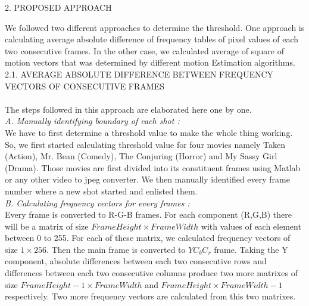 \documentclass[twocolumn,twoside]{article}
\begin{document}
		
		\vspace{-0.6cm}
		\begin{center}
		    {\large 2. PROPOSED APPROACH}
		\end{center} 
		\vspace{-0.5cm}
		
We followed two different approaches to determine the threshold. One approach is calculating average absolute difference of frequency tables of pixel values of each two consecutive frames. In the other case, we calculated average of square of motion vectors that was determined by different motion Estimation algorithms. \\   
		
		\vspace{3cm}
		{\normalsize 2.1. AVERAGE ABSOLUTE DIFFERENCE BETWEEN FREQUENCY VECTORS OF CONSECUTIVE FRAMES}\\ \\
		
The steps followed in this approach are elaborated here one by one.\\
		
		\textit{A. Manually identifying boundary of each shot :}\\
		
		We have to first determine a threshold value to make the whole thing working. So, we first started calculating threshold value for four movies namely Taken (Action), Mr. Bean (Comedy), The Conjuring (Horror) and My Sassy Girl (Drama). Those movies are first divided into its constituent frames using Matlab or any other video to jpeg converter. We then manually identified every frame number where a new shot started and enlisted them.\\ 
		
		\vspace{0.4cm}
		\textit{B. Calculating frequency vectors for every frames : }\\ 
		
		Every frame is converted to R-G-B frames. For each component (R,G,B) there will be a matrix of size $FrameHeight\times FrameWidth$ with values of each element between 0 to 255. For each of these matrix, we calculated frequency vectors of size $1\times 256$. Then the main frame is converted to $YC_bC_r$ frame. Taking the Y component, absolute differences between each two consecutive rows and differences between each two consecutive columns produce two more matrixes of size $FrameHeight-1\times FrameWidth$ and $FrameHeight\times FrameWidth-1$ respectively. Two more frequency vectors are calculated from this two matrixes. 
			
\end{document}
